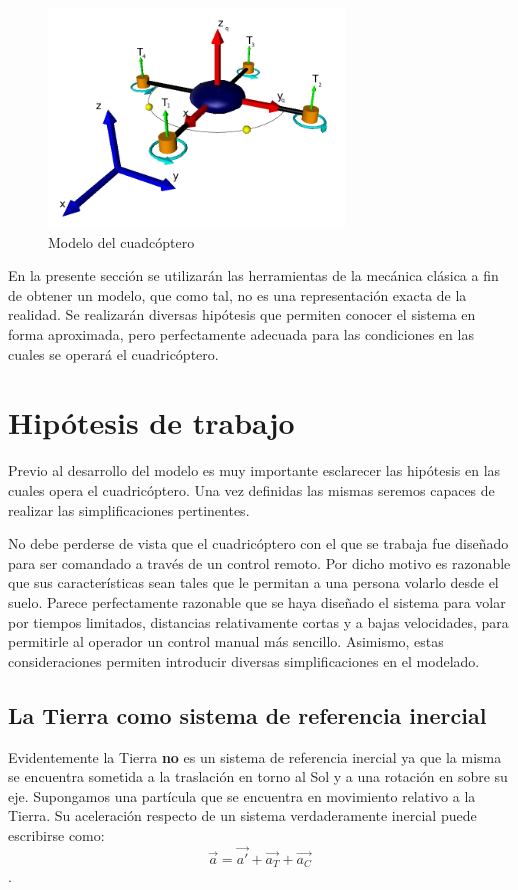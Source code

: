 \documentclass[main]{subfiles}
\begin{document}
    
\begin{figure}
	\centering
	\includegraphics[width=0.7\textwidth]{./pics_modelo_fisico/quad_coord.jpg}
	\caption{Modelo del cuadc\'optero	}
	\label{fig:quad}
\end{figure}






En la presente secci\'on se utilizar\'an las herramientas de la mec\'anica cl\'asica a fin de obtener un modelo, que como tal, no es una representaci\'on exacta de la realidad. Se realizar\'an diversas hip\'otesis que permiten conocer el sistema en forma aproximada, pero perfectamente adecuada para las condiciones en las cuales se operar\'a el cuadric\'optero. 

\section{Hip\'otesis de trabajo}

Previo al desarrollo del modelo es muy importante esclarecer las hip\'otesis en las cuales opera el cuadric\'optero. Una vez definidas las mismas seremos capaces de realizar las simplificaciones pertinentes.



No debe perderse de vista que el cuadric\'optero con el que se trabaja fue dise\~nado para ser comandado a trav\'es de un control remoto. Por dicho motivo es razonable que sus caracter\'isticas sean tales que le permitan a una persona volarlo desde el suelo. Parece perfectamente razonable que se haya dise\~nado el sistema para volar por tiempos limitados, distancias relativamente cortas y a bajas velocidades, para permitirle al operador un control manual m\'as sencillo. Asimismo, estas consideraciones permiten introducir diversas simplificaciones en el modelado.


\subsection{La Tierra como sistema de referencia inercial}
Evidentemente la Tierra {\bf no} es un sistema de referencia inercial ya que la misma se encuentra sometida a la traslaci\'on en torno al Sol y a una rotaci\'on en sobre su eje. Supongamos una part\'icula que se encuentra en movimiento relativo a la Tierra. Su aceleraci\'on respecto de un sistema verdaderamente inercial puede escribirse como:
\begin{equation}
\vec{a}=\vec{a\prime}+\vec{a_T} +\vec{a_C}
\end{equation}.
\end{document}
